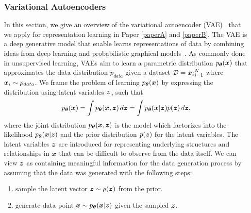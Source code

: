 
\subsubsection{Variational Autoencoders}\label{sec:variational_autoencoders}

In this section, we give an overview of the variational autoencoder (VAE)~\cite{kingma2013auto, kingma2019introduction} that we apply for representation learning in Paper \ref{paperA} and \ref{paperB}. 
The VAE is a deep generative model that enable learns representations of data by combining ideas from deep learning and probabilistic graphical models~\cite{koller2009probabilistic}. As commonly done in unsupervised learning, VAEs aim to learn a parametric distribution $p_{{\bm{\theta}}}({\bm{x}})$ that approximates the data distribution $p_{data}$ given a dataset ${\mathcal{D}} = {{\bm{x}}_i}_{i=1}^{N}$ where ${\bm{x}}_i \sim p_{data}$. We frame the problem of learning $p_{{\bm{\theta}}}({\bm{x}})$ by expressing the distribution using latent variables ${\bm{z}}$, such that
\begin{equation}\label{eq:px}
	p_{{\bm{\theta}}}({\bm{x}}) = \int p_{{\bm{\theta}}}({\bm{x}}, {\bm{z}}) \, d{\bm{z}} = \int p_{{\bm{\theta}}}({\bm{x}} | {\bm{z}}) p({\bm{z}}) \, d{\bm{z}},
\end{equation}
where the joint distribution $p_{{\bm{\theta}}}({\bm{x}}, {\bm{z}})$ is the model which factorizes into the likelihood $p_{{\bm{\theta}}}({\bm{x}} | {\bm{z}})$ and the prior distribution $p({\bm{z}})$ for the latent variables. The latent variables ${\bm{z}}$ are introduced for representing underlying structures and relationships in ${\bm{x}}$ that can be difficult to observe from the data itself. We can view ${\bm{z}}$ as containing meaningful information for the data generation process by assuming that the data was generated with the following steps: 
\begin{enumerate}[topsep=1pt,noitemsep]
	\item sample the latent vector ${\bm{z}} \sim p({\bm{z}})$ from the prior.
	\item generate data point ${\bm{x}} \sim p_{{\bm{\theta}}}({\bm{x}} | {\bm{z}})$ given the sampled ${\bm{z}}$.
\end{enumerate}

